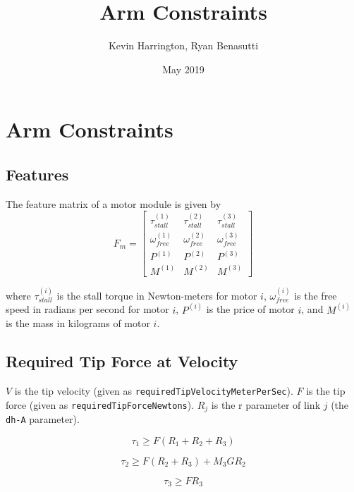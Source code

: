 \documentclass{article}
\title{Arm Constraints}
\author{Kevin Harrington, Ryan Benasutti}
\date{May 2019}
\begin{document}
\maketitle

\FloatBarrier
\section{Arm Constraints}

\FloatBarrier
\subsection{Features}

The feature matrix of a motor module is given by
\begin{equation}
    F_m =
    \begin{bmatrix}
        \tau_{stall}^{(1)} & \tau_{stall}^{(2)} & \tau_{stall}^{(3)} \\[6pt]
        \omega_{free}^{(1)} & \omega_{free}^{(2)} & \omega_{free}^{(3)} \\[6pt]
        P^{(1)} & P^{(2)} & P^{(3)} \\[6pt]
        M^{(1)} & M^{(2)} & M^{(3)}
    \end{bmatrix}
\end{equation}

where $\tau_{stall}^{(i)}$ is the stall torque in Newton-meters for motor $i$,
$\omega_{free}^{(i)}$ is the free speed in radians per second for motor $i$,
$P^{(i)}$ is the price of motor $i$, and $M^{(i)}$ is the mass in kilograms of
motor $i$.

\FloatBarrier
\subsection{Required Tip Force at Velocity}

$V$ is the tip velocity (given as \texttt{requiredTipVelocityMeterPerSec}). $F$
is the tip force (given as \texttt{requiredTipForceNewtons}). $R_j$ is the r
parameter of link $j$ (the \texttt{dh-A} parameter).

\begin{equation}
    \tau_1 \geq F(R_1 + R_2 + R_3)
\end{equation}

\begin{equation}
    \tau_2 \geq F(R_2 + R_3) + M_3 G R_2
\end{equation}

\begin{equation}
    \tau_3 \geq F R_3
\end{equation}
\end{document}
